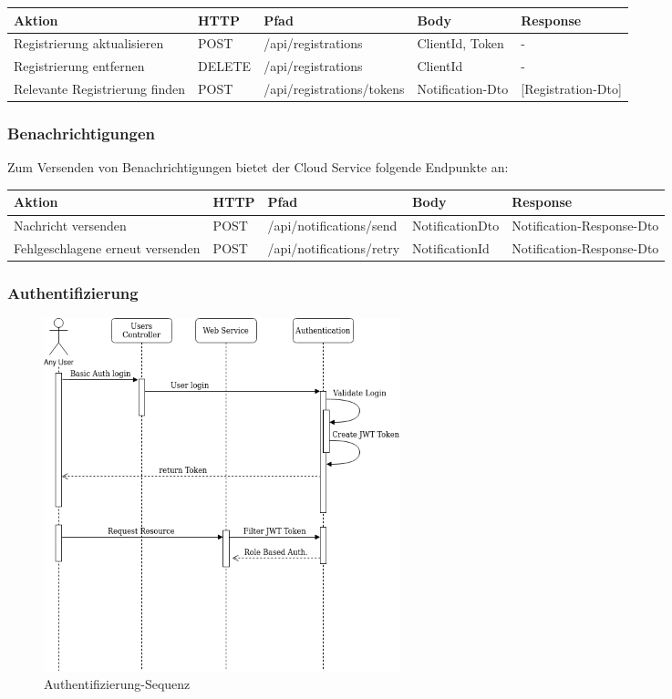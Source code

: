 \begin{tabularx}{\textwidth}{|p{5cm}|l|l|X|X|}
    \hline
    \textbf{Aktion}                & \textbf{HTTP} & \textbf{Pfad}             & \textbf{Body}   & \textbf{Response} \\
    \hline
    Registrierung aktualisieren    & POST          & /api/registrations       & ClientId, Token & -                 \\
    \hline
    Registrierung entfernen        & DELETE        & /api/registrations       & ClientId        & -                 \\
    \hline
    Relevante Registrierung finden & POST          & /api/registrations/tokens & Notification-Dto & [Registration-Dto] \\
    \hline
\end{tabularx}\label{tab:registrationsapimethods}

\subsubsection*{Benachrichtigungen}

Zum Versenden von Benachrichtigungen bietet der Cloud Service folgende Endpunkte an:

\begin{tabularx}{\textwidth}{|p{5cm}|l|l|l|X|}
    \hline
    \textbf{Aktion}                  & \textbf{HTTP} & \textbf{Pfad}            & \textbf{Body}   & \textbf{Response}       \\
    \hline
    Nachricht versenden              & POST          & /api/notifications/send & NotificationDto & Notification-Response-Dto \\
    \hline
    Fehlgeschlagene erneut versenden & POST          & /api/notifications/retry & NotificationId  & Notification-Response-Dto \\
    \hline
\end{tabularx}\label{tab:registrationsapimethodss}

\clearpage

\subsubsection*{Authentifizierung}
\begin{figure}[h]
    \centering
    \includegraphics[width=0.5\textwidth]{graphics/Authentication-export}\caption[Authentifizierung-Sequenz]{Authentifizierung-Sequenz}
\end{figure}


\clearpage

